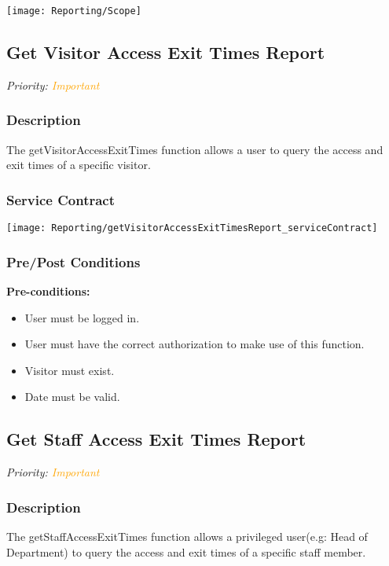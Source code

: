 \texttt{[image: Reporting/Scope]}
\subsection{Get Visitor Access Exit Times Report}
\textit{Priority: \textcolor{orange}{Important}}

\subsubsection{Description}
The getVisitorAccessExitTimes function allows a user to query the access and exit times of a specific visitor.

		
\subsubsection{Service Contract}
\texttt{[image: Reporting/getVisitorAccessExitTimesReport\_serviceContract]}
\subsubsection{Pre/Post Conditions}
	\textbf{Pre-conditions:}
	\begin{itemize}
		\item User must be logged in.
		\item User must have the correct authorization to make use of this function.
		\item Visitor must exist.
		\item Date must be valid.
	\end{itemize}

\subsection{Get Staff Access Exit Times Report}
\textit{Priority: \textcolor{orange}{Important}}

\subsubsection{Description}
The getStaffAccessExitTimes function allows a privileged user(e.g: Head of Department) to query the access and exit times of a specific staff member.

